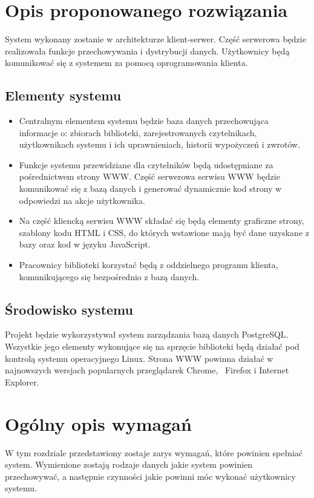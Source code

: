 \documentclass[11pt,a4paper]{article}
\begin{document}
\section{Opis proponowanego rozwiązania}
System wykonany zostanie w architekturze klient-serwer. Część serwerowa będzie
realizowała funkcje przechowywania i dystrybucji danych. Użytkownicy będą
komunikować się z systemem za pomocą oprogramowania klienta.

\subsection{Elementy systemu}
\begin{itemize}
  \item Centralnym elementem systemu będzie baza danych przechowująca
    informacje o: zbiorach biblioteki, zarejestrowanych czytelnikach,
    użytkownikach systemu i ich uprawnieniach, historii wypożyczeń i zwrotów.
  \item Funkcje systemu przewidziane dla czytelników będą udostępniane za
    pośrednictwem strony WWW. Część serwerowa serwisu WWW będzie
    komunikować się z bazą danych i generować dynamicznie kod strony w
    odpowiedzi na akcje użytkownika.
  \item Na część kliencką serwisu WWW składać się będą elementy graficzne
    strony, szablony kodu HTML i CSS, do których wstawione mają być dane
    uzyskane z bazy oraz kod w języku JavaScript.
  \item Pracownicy biblioteki korzystać będą z oddzielnego programu klienta,
    komunikującego się bezpośrednio z bazą danych.
\end{itemize}

\subsection{Środowisko systemu}
Projekt będzie wykorzystywał system zarządzania bazą danych {\sc PostgreSQL}.
Wszystkie jego elementy wykonujące się na sprzęcie biblioteki będą działać pod
kontrolą systemu operacyjnego \mbox{\sc Linux}. Strona WWW powinna działać w
najnowszych wersjach popularnych przeglądarek \mbox{\sc Chrome}, \mbox{\sc
Firefox} i {\sc \mbox{Internet} \mbox{Explorer}}.

\section{Ogólny opis wymagań}
W tym rozdziale przedstawiony zostaje zarys wymagań, które powinien spełniać
system. Wymienione zostają rodzaje danych jakie system powinien przechowywać, a
następnie czynności jakie powinni móc wykonać użytkownicy systemu.
\end{document}
